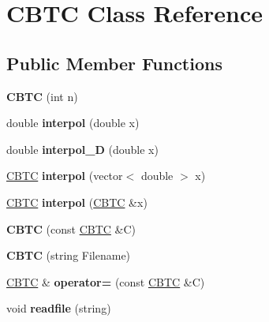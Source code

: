 \hypertarget{class_c_b_t_c}{}\section{C\+B\+TC Class Reference}
\label{class_c_b_t_c}
\subsection*{Public Member Functions}
\begin{DoxyCompactItemize}
\item 
\mbox{\label{class_c_b_t_c_aae2fd9b4dd77f6bb2ceed1588b9efecf}} 
{\bfseries C\+B\+TC} (int n)
\item 
\mbox{\label{class_c_b_t_c_a1b5aedc6ce0572d9e8cebb13642e7cba}} 
double {\bfseries interpol} (double x)
\item 
\mbox{\label{class_c_b_t_c_a2a9ec8265a146d77e307b206ba6012fb}} 
double {\bfseries interpol\+\_\+D} (double x)
\item 
\mbox{\label{class_c_b_t_c_a96780d818666c2ce1ec39fab41e9520e}} 
\hyperlink{class_c_b_t_c}{C\+B\+TC} {\bfseries interpol} (vector$<$ double $>$ x)
\item 
\mbox{\label{class_c_b_t_c_aa78727ed187e3030488a1b06546b7285}} 
\hyperlink{class_c_b_t_c}{C\+B\+TC} {\bfseries interpol} (\hyperlink{class_c_b_t_c}{C\+B\+TC} \&x)
\item 
\mbox{\label{class_c_b_t_c_a6969a5dbd4dc0c93e51c57ef46b90fc1}} 
{\bfseries C\+B\+TC} (const \hyperlink{class_c_b_t_c}{C\+B\+TC} \&C)
\item 
\mbox{\label{class_c_b_t_c_aa1ca41b4e65aa4ebb86ec92d24771431}} 
{\bfseries C\+B\+TC} (string Filename)
\item 
\mbox{\label{class_c_b_t_c_a121df863074a32df953ac4437ecba3bb}} 
\hyperlink{class_c_b_t_c}{C\+B\+TC} \& {\bfseries operator=} (const \hyperlink{class_c_b_t_c}{C\+B\+TC} \&C)
\item 
\mbox{\label{class_c_b_t_c_a6ed90552038100dde636fb7a35ef9a81}} 
void {\bfseries readfile} (string)

\end{DoxyCompactItemize}
